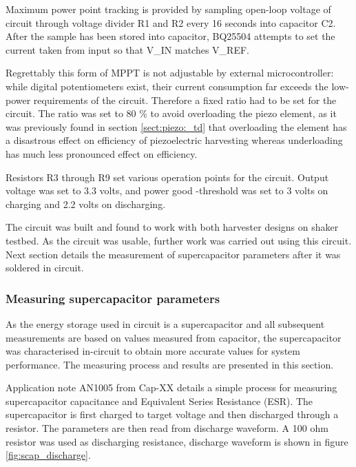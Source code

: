 Maximum power point tracking is provided by sampling open-loop voltage of circuit through voltage divider R1 and R2 every 16 seconds into capacitor C2. After the sample has been stored into capacitor, BQ25504 attempts to set the current taken from input so that V\_IN matches V\_REF. 

Regrettably this form of MPPT is not adjustable by external microcontroller: while digital potentiometers exist, their current consumption far exceeds the low-power requirements of the circuit. Therefore a fixed ratio had to be set for the circuit. The ratio was set to 80 \% to avoid overloading the piezo element, as it was previously found in section \ref{sect:piezo:_td} that overloading the element has a disastrous effect on efficiency of piezoelectric harvesting whereas underloading has much less pronounced effect on efficiency.

Resistors R3 through R9 set various operation points for the circuit. Output voltage was set to 3.3 volts, and power good -threshold was set to 3 volts on charging and 2.2 volts on discharging. 

The circuit was built and found to work with both harvester designs on shaker testbed. As the circuit was usable, further work was carried out using this circuit. Next section details the measurement of supercapacitor parameters after it was soldered in circuit.

\subsubsection{Measuring supercapacitor parameters}
As the energy storage used in circuit is a supercapacitor and all subsequent measurements are based on values measured from capacitor, the supercapacitor was characterised in-circuit to obtain more accurate values for system performance. The measuring process and results are presented in this section.

Application note AN1005 from Cap-XX \cite{capxxan1005} details a simple process for measuring supercapacitor capacitance and Equivalent Series Resistance (ESR). The supercapacitor is first charged to target voltage and then discharged through a resistor. The parameters are then read from discharge waveform. A 100 ohm resistor was used as discharging resistance, discharge waveform is shown in figure \ref{fig:scap_discharge}. 

